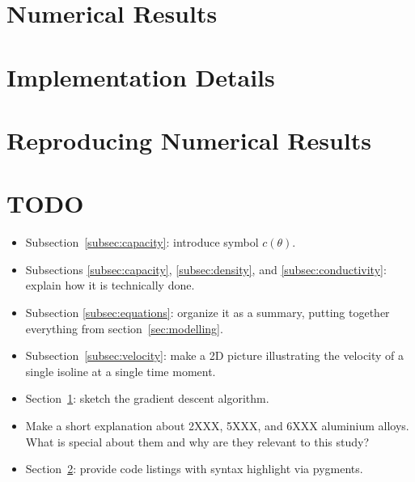\section{Numerical Results}
\label{sec:numericals}

\appendix

\section{Implementation Details}
\label{sec:implementation}

\section{Reproducing Numerical Results}


\section{TODO}
\begin{itemize}
	\item Subsection~\ref{subsec:capacity}: introduce symbol $c(\theta)$.
	\item Subsections \ref{subsec:capacity}, \ref{subsec:density}, and \ref{subsec:conductivity}: explain how it is technically done.
	\item Subsection \ref{subsec:equations}: organize it as a summary, putting together everything from section~\ref{sec:modelling}.
	\item Subsection~\ref{subsec:velocity}: make a 2D picture illustrating the velocity of a single isoline at a single time moment.
	\item Section~\ref{sec:numericals}: sketch the gradient descent algorithm.
	\item Make a short explanation about 2XXX, 5XXX, and 6XXX aluminium alloys. What is special about them and why are they relevant to this study?
	\item Section~\ref{sec:implementation}: provide code listings with syntax highlight via pygments.
\end{itemize}